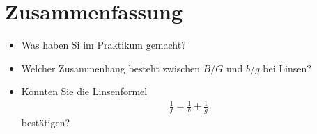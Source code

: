 \documentclass[12pt,a4paper]{article}
\begin{document}
\section*{Zusammenfassung}
\begin{itemize}
	\item Was haben Si im Praktikum gemacht?
	\item Welcher Zusammenhang besteht zwischen $B/G$ und $b/g$ bei Linsen?
	\item Konnten Sie die Linsenformel
		\begin{eqnarray*}
			\frac{1}{f} = \frac{1}{b} + \frac{1}{g}
		\end{eqnarray*}
bestätigen?
\end{itemize}
\end{document}
